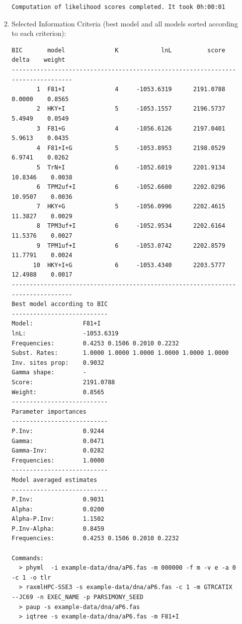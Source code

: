 \begin{enumerate}
\begin{enumerate}
\begin{lstlisting}
Computation of likelihood scores completed. It took 0h:00:01
\end{lstlisting}

\item Selected Information Criteria (best model and all models sorted according to each criterion):

\begin{lstlisting}
BIC       model              K            lnL          score          delta    weight
--------------------------------------------------------------------------------
       1  F81+I              4     -1053.6319      2191.0788         0.0000    0.8565
       2  HKY+I              5     -1053.1557      2196.5737         5.4949    0.0549
       3  F81+G              4     -1056.6126      2197.0401         5.9613    0.0435
       4  F81+I+G            5     -1053.8953      2198.0529         6.9741    0.0262
       5  TrN+I              6     -1052.6019      2201.9134        10.8346    0.0038
       6  TPM2uf+I           6     -1052.6600      2202.0296        10.9507    0.0036
       7  HKY+G              5     -1056.0996      2202.4615        11.3827    0.0029
       8  TPM3uf+I           6     -1052.9534      2202.6164        11.5376    0.0027
       9  TPM1uf+I           6     -1053.0742      2202.8579        11.7791    0.0024
      10  HKY+I+G            6     -1053.4340      2203.5777        12.4988    0.0017
--------------------------------------------------------------------------------
Best model according to BIC
---------------------------
Model:              F81+I
lnL:                -1053.6319
Frequencies:        0.4253 0.1506 0.2010 0.2232 
Subst. Rates:       1.0000 1.0000 1.0000 1.0000 1.0000 1.0000 
Inv. sites prop:    0.9032
Gamma shape:        -
Score:              2191.0788
Weight:             0.8565
---------------------------
Parameter importances
---------------------------
P.Inv:              0.9244
Gamma:              0.0471
Gamma-Inv:          0.0282
Frequencies:        1.0000
---------------------------
Model averaged estimates
---------------------------
P.Inv:              0.9031
Alpha:              0.0200
Alpha-P.Inv:        1.1502
P.Inv-Alpha:        0.8459
Frequencies:        0.4253 0.1506 0.2010 0.2232 

Commands:
  > phyml  -i example-data/dna/aP6.fas -m 000000 -f m -v e -a 0 -c 1 -o tlr
  > raxmlHPC-SSE3 -s example-data/dna/aP6.fas -c 1 -m GTRCATIX --JC69 -n EXEC_NAME -p PARSIMONY_SEED
  > paup -s example-data/dna/aP6.fas
  > iqtree -s example-data/dna/aP6.fas -m F81+I
\end{lstlisting}


\end{enumerate}
\end{enumerate}
